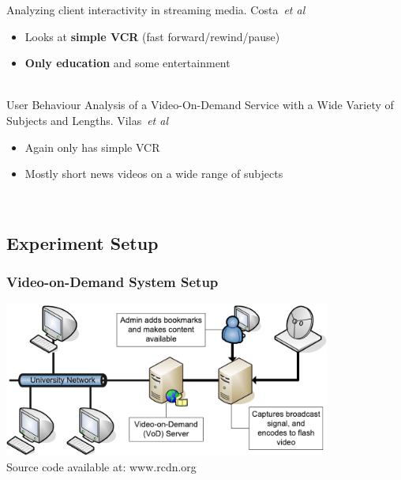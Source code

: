 \documentclass[xcolor=pdftex,dvipsnames,table]{beamer}
\begin{document}
\begin{frame}
{        %
        Analyzing client interactivity in streaming media. Costa~{\it et al}
        \begin{itemize}
            \item Looks at \textbf{simple VCR} (fast forward/rewind/pause)
            \item \textbf{Only education} and some entertainment
        \end{itemize}~\\

        User Behaviour Analysis of a Video-On-Demand Service with a Wide Variety of Subjects and Lengths. Vilas~{\it et al}
        \begin{itemize}
            \item Again only has simple VCR
            \item Mostly short news videos on a wide range of subjects
        \end{itemize}~\\

    }

\end{frame}

\subsection{Experiment Setup}

\begin{frame}
    \frametitle{Video-on-Demand System Setup}

    \begin{center}
        \includegraphics[width=10.75cm]{../NOSSDAV07/diagrams/setup}
        \\Source code available at: www.rcdn.org
    \end{center}

\end{frame}
\end{document}
